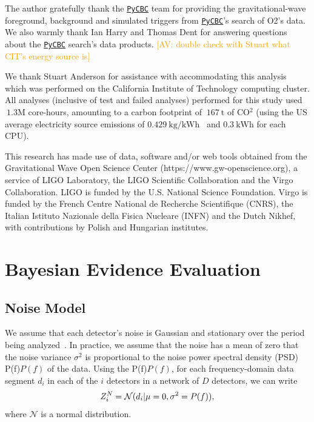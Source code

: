 \documentclass[%
 nofootinbib,
 amsmath,amssymb,
 aps,
 twocolumn,
 superscriptaddress
]{revtex4-2}
\newcommand{\pycbc}{{\sc \href{https://pycbc.org/}{\texttt{PyCBC}}}\xspace}
\newcommand{\mathcmd}[1]{{\sc \relax\ifmmode#1\else $#1$\fi}\xspace}
\newcommand{\psd}{\mathcmd{P(f)}}
\newcommand{\avi}[1]{\textcolor{orange}{[AV: #1]}}
\begin{document}
\begin{acknowledgments}

The author gratefully thank the \pycbc team for providing the gravitational-wave foreground, background and simulated triggers from \pycbc's search of O2's data. We also warmly thank Ian Harry and Thomas Dent for answering questions about the \pycbc search's data products.  
\avi{double check with Stuart what CIT's energy source is}

We thank Stuart Anderson for assistance with accommodating this analysis which was performed on the California Institute of Technology computing cluster. All analyses (inclusive of test and failed analyses) performed for this study used $~1.3\mathrm{M}$ core-hours, amounting to a carbon footprint of $~167\ \mathrm{t}$ of CO$^2$ (using the US average electricity source emissions of $0.429\ \text{kg/kWh}$~\cite{greenhouse} and $0.3\ \text{kWh}$ for each CPU).

This research has made use of data, software and/or web tools obtained from the Gravitational Wave Open Science Center (https://www.gw-openscience.org), a service of LIGO Laboratory, the LIGO Scientific Collaboration and the Virgo Collaboration. LIGO is funded by the U.S. National Science Foundation. Virgo is funded by the French Centre National de Recherche Scientifique (CNRS), the Italian Istituto Nazionale della Fisica Nucleare (INFN) and the Dutch Nikhef, with contributions by Polish and Hungarian institutes.


\end{acknowledgments}

\appendix



\section{Bayesian Evidence Evaluation}\label{sec:bayesianEvidEval}
\subsection{Noise Model}
We assume that each detector's noise is Gaussian and stationary over the period being analyzed~\cite{ligo_psd}. In practice, we assume that the noise has a mean of zero that the noise variance $\sigma^2$ is proportional to the noise power spectral density (PSD) \psd of the data. Using the \psd, for each frequency-domain data segment $d_i$ in each of the $i$ detectors in a network of $D$ detectors, we can write 
\begin{equation}
\label{eq:zn}
Z^N_i = \mathcal{N}(d_i|\mu=0,\sigma^2=\psd),
\end{equation}
where $\mathcal{N}$ is a normal distribution. 
\end{document}
